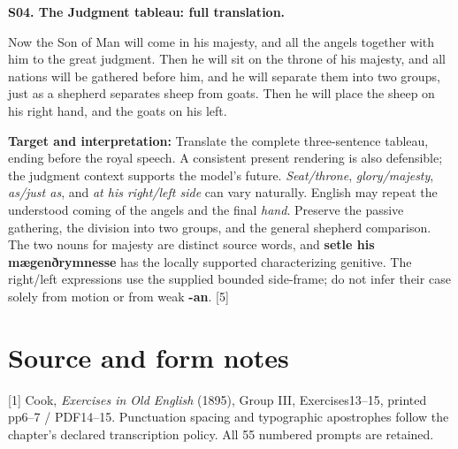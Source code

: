 \par\begin{minipage}{\linewidth}\raggedright
\textbf{S04. The Judgment tableau: full translation.}

Now the Son of Man will come in his majesty, and all the angels together with him to the great judgment. Then he will sit on the throne of his majesty, and all nations will be gathered before him, and he will separate them into two groups, just as a shepherd separates sheep from goats. Then he will place the sheep on his right hand, and the goats on his left.

\textbf{Target and interpretation:} Translate the complete three-sentence tableau, ending before the royal speech. A consistent present rendering is also defensible; the judgment context supports the model's future. \emph{Seat/\allowbreak{}throne}, \emph{glory/\allowbreak{}majesty}, \emph{as/\allowbreak{}just as}, and \emph{at his right/\allowbreak{}left side} can vary naturally. English may repeat the understood coming of the angels and the final \emph{hand}. Preserve the passive gathering, the division into two groups, and the general shepherd comparison. The two nouns for majesty are distinct source words, and \textbf{setle his mægenðrymnesse} has the locally supported characterizing genitive. The right/\allowbreak{}left expressions use the supplied bounded side-frame; do not infer their case solely from motion or from weak \textbf{-an}. [5]

\end{minipage}\par\addvspace{4pt}

\clearpage
\section*{Source and form notes}

\begingroup\fontsize{10}{12.8}\selectfont
[1] Cook, \emph{Exercises in Old English} (1895), Group III, Exercises13–15, printed pp6–7 /\allowbreak{} PDF14–15. Punctuation spacing and typographic apostrophes follow the chapter's declared transcription policy. All 55 numbered prompts are retained.

